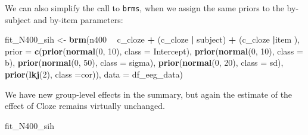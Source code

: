 \documentclass[12pt,]{krantz}
\newenvironment{Shaded}{\begin{snugshade}}{\end{snugshade}}
\newcommand{\DataTypeTok}[1]{\textcolor[rgb]{0.13,0.29,0.53}{#1}}
\newcommand{\DecValTok}[1]{\textcolor[rgb]{0.00,0.00,0.81}{#1}}
\newcommand{\KeywordTok}[1]{\textcolor[rgb]{0.13,0.29,0.53}{\textbf{#1}}}
\newcommand{\NormalTok}[1]{#1}
\newcommand{\OperatorTok}[1]{\textcolor[rgb]{0.81,0.36,0.00}{\textbf{#1}}}
\newcommand{\StringTok}[1]{\textcolor[rgb]{0.31,0.60,0.02}{#1}}
\theoremstyle{definition}
\theoremstyle{definition}
\theoremstyle{definition}
\theoremstyle{remark}
\begin{document}
We can also simplify the call to \texttt{brms}, when we assign the same priors to the by-subject and by-item parameters:

\begin{Shaded}
\begin{Highlighting}[]
\NormalTok{fit_N400_sih <-}\StringTok{ }\KeywordTok{brm}\NormalTok{(n400 }\OperatorTok{~}\StringTok{ }\NormalTok{c_cloze }\OperatorTok{+}\StringTok{ }\NormalTok{(c_cloze }\OperatorTok{|}\StringTok{ }\NormalTok{subject) }\OperatorTok{+}\StringTok{ }\NormalTok{(c_cloze }\OperatorTok{|}\NormalTok{item ),}
                  \DataTypeTok{prior =}
                      \KeywordTok{c}\NormalTok{(}\KeywordTok{prior}\NormalTok{(}\KeywordTok{normal}\NormalTok{(}\DecValTok{0}\NormalTok{, }\DecValTok{10}\NormalTok{), }\DataTypeTok{class =}\NormalTok{ Intercept),}
                        \KeywordTok{prior}\NormalTok{(}\KeywordTok{normal}\NormalTok{(}\DecValTok{0}\NormalTok{, }\DecValTok{10}\NormalTok{), }\DataTypeTok{class =}\NormalTok{ b),}
                        \KeywordTok{prior}\NormalTok{(}\KeywordTok{normal}\NormalTok{(}\DecValTok{0}\NormalTok{, }\DecValTok{50}\NormalTok{), }\DataTypeTok{class =}\NormalTok{ sigma),}
                        \KeywordTok{prior}\NormalTok{(}\KeywordTok{normal}\NormalTok{(}\DecValTok{0}\NormalTok{, }\DecValTok{20}\NormalTok{), }\DataTypeTok{class =}\NormalTok{ sd),}
                        \KeywordTok{prior}\NormalTok{(}\KeywordTok{lkj}\NormalTok{(}\DecValTok{2}\NormalTok{), }\DataTypeTok{class =}\NormalTok{cor)),}
                  \DataTypeTok{data =}\NormalTok{ df_eeg_data)}
\end{Highlighting}
\end{Shaded}

We have new group-level effects in the summary, but again the estimate of the effect of Cloze remains virtually unchanged.

\begin{Shaded}
\begin{Highlighting}[]
\NormalTok{fit_N400_sih}
\end{Highlighting}
\end{Shaded}
\end{document}
